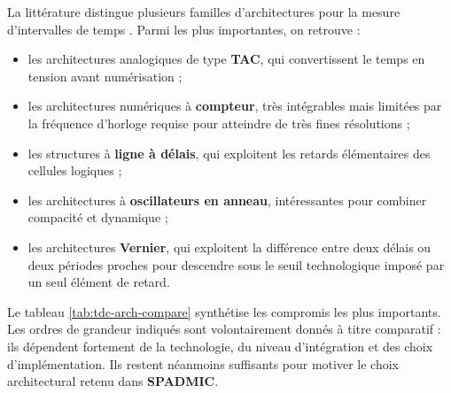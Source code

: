 La littérature distingue plusieurs familles d'architectures pour la mesure d'intervalles de temps \cite{annagrebah2021thesis,henzler2010tdc}. Parmi les plus importantes, on retrouve :
\begin{itemize}
    \item les architectures analogiques de type \textbf{TAC}, qui convertissent le temps en tension avant numérisation ;
    \item les architectures numériques à \textbf{compteur}, très intégrables mais limitées par la fréquence d’horloge requise pour atteindre de très fines résolutions ;
    \item les structures à \textbf{ligne à délais}, qui exploitent les retards élémentaires des cellules logiques ;
    \item les architectures à \textbf{oscillateurs en anneau}, intéressantes pour combiner compacité et dynamique ;
    \item les architectures \textbf{Vernier}, qui exploitent la différence entre deux délais ou deux périodes proches pour descendre sous le seuil technologique imposé par un seul élément de retard.
\end{itemize}

Le tableau \ref{tab:tdc-arch-compare} synthétise les compromis les plus importants. Les ordres de grandeur indiqués sont volontairement donnés à titre comparatif : ils dépendent fortement de la technologie, du niveau d'intégration et des choix d'implémentation. Ils restent néanmoins suffisants pour motiver le choix architectural retenu dans \textbf{SPADMIC}.

